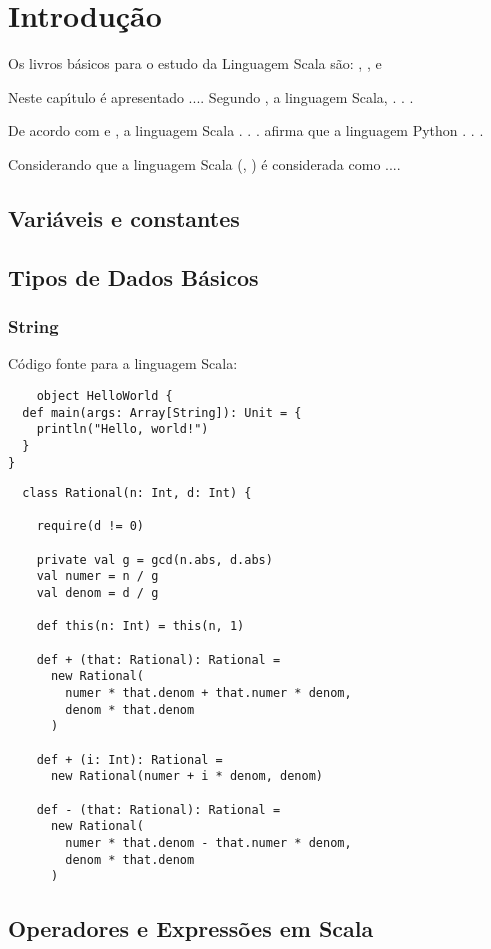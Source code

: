

\chapter{Introdução}

Os livros b\'{a}sicos para o estudo da Linguagem Scala s\~{a}o: \cite{Elahi}, \cite{Wampler2021}, \cite{Nilanjan} e \cite{}

Neste cap\'{\i}tulo \'{e} apresentado ....  Segundo \cite{}, a linguagem Scala,  . . .

De acordo com \cite{} e \cite{}, a linguagem Scala . . . \cite{} afirma que a linguagem Python . . .

Considerando que a linguagem Scala (\cite{}, \cite{}) \'{e} considerada como ....

\section{Vari\'{a}veis e constantes}


\section{Tipos de Dados B\'{a}sicos}

\subsection{String}

C\'{o}digo fonte para a linguagem Scala:
\begin{lstlisting}
    object HelloWorld {
  def main(args: Array[String]): Unit = {
    println("Hello, world!")
  }
}
    \end{lstlisting}

\begin{lstlisting}
  class Rational(n: Int, d: Int) {

    require(d != 0)

    private val g = gcd(n.abs, d.abs)
    val numer = n / g
    val denom = d / g

    def this(n: Int) = this(n, 1)

    def + (that: Rational): Rational =
      new Rational(
        numer * that.denom + that.numer * denom,
        denom * that.denom
      )

    def + (i: Int): Rational =
      new Rational(numer + i * denom, denom)

    def - (that: Rational): Rational =
      new Rational(
        numer * that.denom - that.numer * denom,
        denom * that.denom
      )
    \end{lstlisting}
\section{Operadores e Express\~{o}es em Scala}
